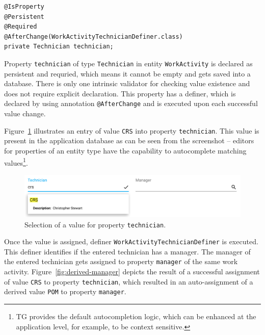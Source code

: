 \documentclass[a4paper,12pt,oneside,openright,final]{memoir} %
\begin{document}
	\begin{tcolorbox}[sidebyside, righthand width=0.38\textwidth, title=Example: property with a definer]
    \begin{lstlisting}[numbersep=2pt]
@IsProperty
@Persistent
@Required
@AfterChange(WorkActivityTechnicianDefiner.class)
private Technician technician;
    \end{lstlisting}
	
	\tcblower
		\tiny
		Property \texttt{technician} of type \texttt{Technician} in entity \texttt{WorkActivity} is declared as persistent and requried, which means it cannot be empty and gets saved into a database.
		There is only one intrinsic validator for checking value existence and does not require explicit declaration.
		This property has a definer, which is declared by using annotation \texttt{@AfterChange} and is executed upon each successful value change.
 	\end{tcolorbox}

	
	Figure~\ref{fig:tech} illustrates an entry of value \texttt{CRS} into property \texttt{technician}.
	This value is present in the application database as can be seen from the screenshot -- editors for properties of an entity type have the capability to autocomplete matching values\footnote{TG provides the default autocompletion logic, which can be enhanced at the application level, for example, to be context sensitive.}.
	
	\begin{figure}[!h]
  		\centering
      	\includegraphics[width=1.0\textwidth]{images/04-wa-technician-entry.png}  
   	  	\caption{Selection of a value for property \texttt{technician}.}
   		\label{fig:tech}
  	\end{figure}
	
	Once the value is assigned, definer \texttt{WorkActivityTechnicianDefiner} is executed.
	This definer identifies if the entered technician has a manager.
	The manager of the entered technician gets assigned to property \texttt{manager} of the same work activity.
	Figure~\ref{fig:derived-manager} depicts the result of a successful assignment of value \texttt{CRS} to property \texttt{technician}, which resulted in an auto-assignment of a derived value \texttt{POM} to property \texttt{manager}.  
\end{document}

